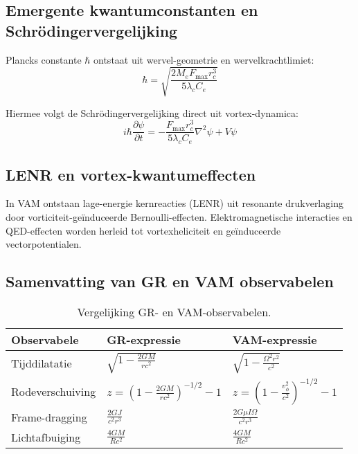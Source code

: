 \subsection*{Emergente kwantumconstanten en Schrödingervergelijking}

Plancks constante $\hbar$ ontstaat uit wervel-geometrie en wervelkrachtlimiet:
\[
\hbar = \sqrt{\frac{2M_e F_{\max} r_c^3}{5 \lambda_c C_e}}
\]

Hiermee volgt de Schrödingervergelijking direct uit vortex-dynamica:
\[
i \hbar \frac{\partial \psi}{\partial t} = -\frac{F_{\max} r_c^3}{5 \lambda_c C_e}\nabla^2 \psi + V\psi
\]

\subsection*{LENR en vortex-kwantumeffecten}

In VAM ontstaan lage-energie kernreacties (LENR) uit resonante drukverlaging door vorticiteit-geïnduceerde Bernoulli-effecten. Elektromagnetische interacties en QED-effecten worden herleid tot vortexheliciteit en geïnduceerde vectorpotentialen.

\subsection*{Samenvatting van GR en VAM observabelen}

\begin{table}[h!]
    \centering
    \begin{tabular}{lll}
        \toprule
        \textbf{Observabele} & \textbf{GR-expressie} & \textbf{VAM-expressie} \\
        \midrule
        Tijddilatatie & $\sqrt{1-\frac{2GM}{rc^2}}$ & $\sqrt{1-\frac{\Omega^2 r^2}{c^2}}$\\[0.5em]
        Rodeverschuiving & $z=\left(1-\frac{2GM}{rc^2}\right)^{-1/2}-1$ & $z=\left(1-\frac{v_\phi^2}{c^2}\right)^{-1/2}-1$\\[0.5em]
        Frame-dragging & $\frac{2GJ}{c^2 r^3}$ & $\frac{2G\mu I\Omega}{c^2 r^3}$\\[0.5em]
        Lichtafbuiging & $\frac{4GM}{Rc^2}$ & $\frac{4GM}{Rc^2}$\\
        \bottomrule
    \end{tabular}
    \caption{Vergelijking GR- en VAM-observabelen.}
    \label{tab:vergelijkingen}
\end{table}




